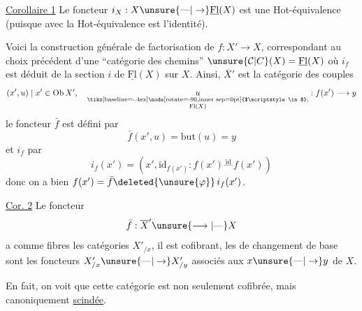 \uline{Corollaire 1} Le foncteur $i_X:X\unsure{\text{---}|\to}\underline{\mathrm{Fl}}(X)$ est une Hot-équivalence (puisque  avec la Hot-équivalence  est l'identité).

Voici la construction générale de factorisation de $f:X'\longrightarrow X$, correspondant au choix précédent d'une ``catégorie des chemins'' $\unsure{\mathcal C|C}(X)=\underline{\mathrm{Fl}}(X)$
où $i_f$ est déduit de la section $i$ de $\underline{\mathrm{Fl}}(X)$ sur $X$. Ainsi, $\overline{X}'$ est la catégorie des couples
\[ (x',u)\mid x'\in\operatorname{Ob}X',\quad \underset{\substack{\text{\tikz[baseline=-.4ex]\node[rotate=-90,inner sep=0pt] {$\scriptstyle\in$};}\\\mathrm{Fl}(X)}}{u}:f(x')\longrightarrow y \]
le foncteur $\bar f$ est défini par
\[ \bar f(x',u)=\mathrm{but}(u)=y \]
et $i_f$ par
\[ i_f(x')=(x',\mathrm{id}_{f(x')}:f(x')\overset{\mathrm{id}}{\text{---}} f(x')) \]
donc on a bien $f(x')=\bar f\deleted{\unsure{\varphi}}\,i_f(x')$.


\uline{Cor. 2} Le foncteur
\[ \bar f:\overline{X}'\unsure{\longrightarrow|\text{---}}X \]
a comme fibres les catégories $X'_{/x}$, il est cofibrant, les   de changement de base sont les foncteurs $X'_{/x}\unsure{\text{---}|\to}X'_{/y}$ associés aux   $x\unsure{\text{---}|\to}y$ de $X$.

En fait, on voit que cette catégorie est non seulement cofibrée, mais canoniquement \uline{scindée}. 

